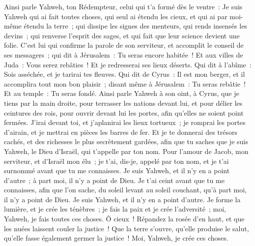 \begin{multicols}{2}
Ainsi parle Yahweh, ton Rédempteur, celui qui t'a formé dès le ventre~: Je suis Yahweh qui ai fait toutes choses, qui seul ai étendu les cieux, et qui ai par moi-même étendu la terre~;
qui dissipe les signes des menteurs, qui rends insensés les devins~; qui renverse l'esprit des sages, et qui fait que leur science devient une folie.
C'est lui qui confirme la parole de son serviteur, et accomplit le conseil de ses messagers~; qui dit à Jérusalem~: Tu seras encore habitée~! Et aux villes de Juda~: Vous serez rebâties~! Et je redresserai ses lieux déserts.
Qui dit à l'abîme~: Sois asséchée, et je tarirai tes fleuves.
Qui dit de Cyrus~: Il est mon berger, et il accomplira tout mon bon plaisir~; disant même à Jérusalem~: Tu seras rebâtie~! Et au temple~: Tu seras fondé.
\VerseOne{}Ainsi parle Yahweh à son oint, à Cyrus,
que je tiens par la main droite, pour terrasser les nations devant lui, et pour délier les ceintures des rois, pour ouvrir devant lui les portes, afin qu'elles ne soient point fermées.
J'irai devant toi, et j'aplanirai les lieux tortueux~; je romprai les portes d'airain, et je mettrai en pièces les barres de fer. Et je te donnerai des trésors cachés, et des richesses le plus secrètement gardées, afin que tu saches que je suis Yahweh, le Dieu d'Israël, qui t'appelle par ton nom.
Pour l'amour de Jacob, mon serviteur, et d'Israël mon élu~; je t'ai, dis-je, appelé par ton nom, et je t'ai surnommé avant que tu me connaisses.
Je suis Yahweh, et il n'y en a point d'autre~; à part moi, il n'y a point de Dieu. Je t'ai ceint avant que tu me connaisses,
afin que l'on sache, du soleil levant au soleil couchant, qu'à part moi, il n'y a point de Dieu. Je suis Yahweh, et il n'y en a point d'autre.
Je forme la lumière, et je crée les ténèbres~; je fais la paix et je crée l'adversité~; moi, Yahweh, je fais toutes ces choses.
Ô cieux~! Répandez la rosée d'en haut, et que les nuées laissent couler la justice~! Que la terre s'ouvre, qu'elle produise le salut, qu'elle fasse également germer la justice~! Moi, Yahweh, je crée ces choses.

\end{multicols}
